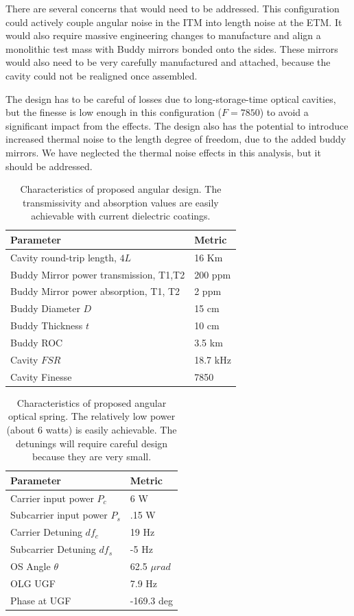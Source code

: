 There are several concerns that would need to be addressed. This configuration could actively couple angular noise in the ITM into length noise at the ETM. It would also require massive engineering changes to manufacture and align a monolithic test mass with Buddy mirrors bonded onto the sides. These mirrors would also need to be very carefully manufactured and attached, because the cavity could not be realigned once assembled.  

The design has to be careful of losses due to long-storage-time optical cavities\cite{Isogai13}, but the finesse is low enough in this configuration ($F=7850$) to avoid a significant impact from the effects. The design also has the potential to introduce increased thermal noise to the length degree of freedom, due to the added buddy mirrors. We have neglected the thermal noise effects in this analysis, but it should be addressed.


\begin{table}[htp]
\centering
\begin{tabular}{ l | l | }
\bf{Parameter}& \bf{Metric}  \\ \hline
Cavity round-trip length, $4L$ & 16 Km \\ \hline
Buddy Mirror power transmission, T1,T2 & 200 ppm \\ \hline
Buddy Mirror power absorption, T1, T2 & 2 ppm \\ \hline
Buddy Diameter $D$ & 15 cm \\ \hline
Buddy Thickness $t$ & 10 cm \\ \hline
Buddy ROC & 3.5 km \\ \hline
Cavity $FSR$ & 18.7  kHz \\ \hline
Cavity Finesse & 7850 \\ \hline

\end{tabular}
\caption[Folded angular design]{Characteristics of proposed angular design. The transmissivity and absorption values are easily achievable with current dielectric coatings.}
\label{tab:foldedproposal}
\end{table}

\begin{table}[htp]
\centering
\begin{tabular}{ l | l | }
\bf{Parameter}& \bf{Metric}  \\ \hline
Carrier input power $P_c$ & 6 W \\ \hline
Subcarrier input power $P_s$ & .15 W \\ \hline
Carrier Detuning $df_c$ & 19 Hz \\ \hline
Subcarrier Detuning $df_s$ & -5 Hz \\ \hline
OS Angle $\theta$ & 62.5 $\mu rad$ \\ \hline
OLG UGF & 7.9 Hz \\ \hline
Phase at UGF & -169.3 deg \\ \hline
\end{tabular}
\caption[Folded angular optical springs]{Characteristics of proposed angular optical spring. The relatively low power (about 6 watts) is easily achievable. The detunings will require careful design because they are very small.}
\label{tab:foldedos}
\end{table}


